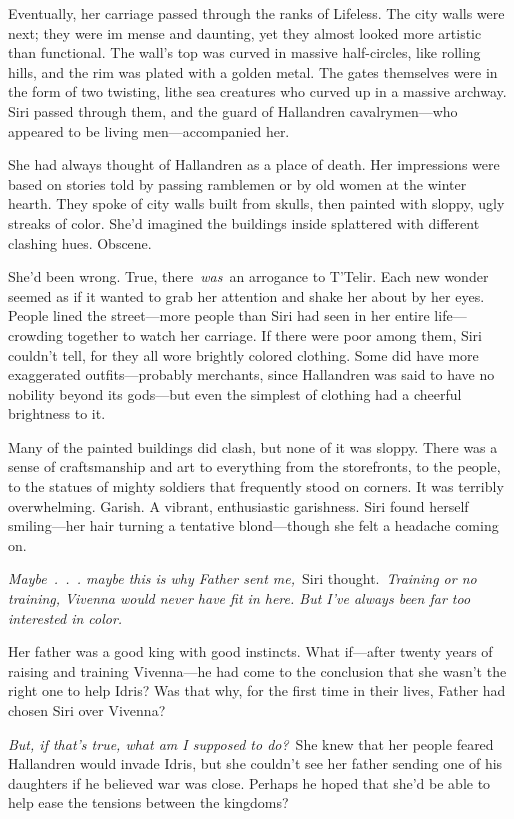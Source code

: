 Eventually, her carriage passed through the ranks of Lifeless. The city walls were next; they were im mense and daunting, yet they almost looked more artistic than functional. The wall’s top was curved in massive half-circles, like rolling hills, and the rim was plated with a golden metal. The gates themselves were in the form of two twisting, lithe sea creatures who curved up in a massive archway. Siri passed through them, and the guard of Hallandren cavalrymen—who appeared to be living men—accompanied her.

She had always thought of Hallandren as a place of death. Her impressions were based on stories told by passing ramblemen or by old women at the winter hearth. They spoke of city walls built from skulls, then painted with sloppy, ugly streaks of color. She’d imagined the buildings inside splattered with different clashing hues. Obscene.

She’d been wrong. True, there~\textit{was}~an arrogance to T’Telir. Each new wonder seemed as if it wanted to grab her attention and shake her about by her eyes. People lined the street—more people than Siri had seen in her entire life—crowding together to watch her carriage. If there were poor among them, Siri couldn’t tell, for they all wore brightly colored clothing. Some did have more exaggerated outfits—probably merchants, since Hallandren was said to have no nobility beyond its gods—but even the simplest of clothing had a cheerful brightness to it.

Many of the painted buildings did clash, but none of it was sloppy. There was a sense of craftsmanship and art to everything from the storefronts, to the people, to the statues of mighty soldiers that frequently stood on corners. It was terribly overwhelming. Garish. A vibrant, enthusiastic garishness. Siri found herself smiling—her hair turning a tentative blond—though she felt a headache coming on.

\textit{Maybe~.~.~. maybe this is why Father sent me,}~Siri thought.~\textit{Training or no training, Vivenna would never have fit in here. But I’ve always been far too interested in color.}

Her father was a good king with good instincts. What if—after twenty years of raising and training Vivenna—he had come to the conclusion that she wasn’t the right one to help Idris? Was that why, for the first time in their lives, Father had chosen Siri over Vivenna?

\textit{But, if that’s true, what am I supposed to do?}~She knew that her people feared Hallandren would invade Idris, but she couldn’t see her father sending one of his daughters if he believed war was close. Perhaps he hoped that she’d be able to help ease the tensions between the kingdoms?

